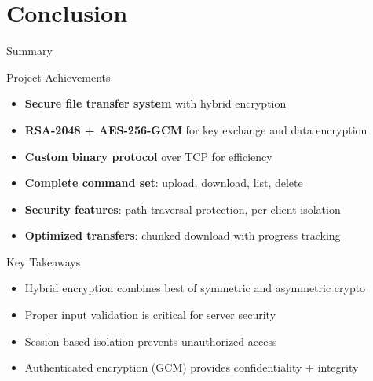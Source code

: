 \documentclass[aspectratio=169]{beamer}
\begin{document}
\section{Conclusion}

\begin{frame}{Summary}
\begin{block}{Project Achievements}
\begin{itemize}
    \item \textbf{Secure file transfer system} with hybrid encryption
    \item \textbf{RSA-2048 + AES-256-GCM} for key exchange and data encryption
    \item \textbf{Custom binary protocol} over TCP for efficiency
    \item \textbf{Complete command set}: upload, download, list, delete
    \item \textbf{Security features}: path traversal protection, per-client isolation
    \item \textbf{Optimized transfers}: chunked download with progress tracking
\end{itemize}
\end{block}

\vspace{0.5cm}

\begin{alertblock}{Key Takeaways}
\begin{itemize}
    \item Hybrid encryption combines best of symmetric and asymmetric crypto
    \item Proper input validation is critical for server security
    \item Session-based isolation prevents unauthorized access
    \item Authenticated encryption (GCM) provides confidentiality + integrity
\end{itemize}
\end{alertblock}
\end{frame}
\end{document}
